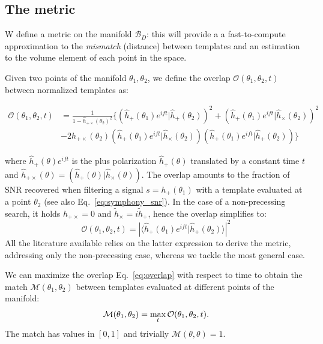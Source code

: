 \documentclass[twocolumn,showpacs,preprintnumbers,nofootinbib,prd,
superscriptaddress,10pt]{revtex4-2}
\newcommand{\scalar}[2]{\langle #1|#2 \rangle}
\newcommand{\rescalar}[2]{( #1 |#2 )}
\newcommand{\rescalarwide}[2]{\left( #1 \lvert #2 \right)}
\begin{document}
\subsection{The metric} \label{sec:metric}

W define a metric on the manifold $\mathcal{B}_D$: this will provide a a fast-to-compute approximation to the {\it mismatch} (distance) between templates and an estimation to the volume element of each point in the space.

Given two points of the manifold $\theta_1,\theta_2$, we define the overlap $\mathcal{O}(\theta_1,\theta_2, t)$ between normalized templates as:
\begin{widetext}
	\begin{align}\label{eq:overlap}
		\mathcal{O}(\theta_1,\theta_2, t) &= \frac{1}{1- \hat{h}_{+\times}(\theta_2)^2} 
		\biggl\{ \rescalarwide{\hat{h}_+(\theta_1)e^{i ft}}{\hat{h}_+(\theta_2)}^2 + \rescalarwide{\hat{h}_+(\theta_1)e^{i ft}}{\hat{h}_\times(\theta_2)}^2 \nonumber \\
		& -2h_{+\times}(\theta_2)\rescalarwide{\hat{h}_+(\theta_1)e^{i ft}}{\hat{h}_\times(\theta_2)}\rescalarwide{\hat{h}_+(\theta_1)e^{i ft}}{\hat{h}_+(\theta_2)} \biggl\}
	\end{align}
\end{widetext}
where $\hat{h}_+(\theta)e^{i ft}$ is the plus polarization $\hat{h}_+(\theta)$ translated by a constant time $t$ and $\hat{h}_{+\times}(\theta) = \rescalar{\hat{h}_+(\theta)}{\hat{h}_\times(\theta)}$.
The overlap amounts to the fraction of SNR recovered when filtering a signal $s=h_+(\theta_1)$ with a template evaluated at a point $\theta_2$ (see also Eq.~\eqref{eq:symphony_snr}).
In the case of a non-precessing search, it holds $h_{+\times} = 0$ and $\tilde{h}_\times = i \tilde{h}_+$, hence the overlap simplifies to:
\begin{equation}\label{eq:overlap_NP}
\mathcal{O}(\theta_1,\theta_2, t) = \left|\scalar{\hat{h}_+(\theta_1)e^{i ft}}{\hat{h}_+(\theta_2)} \right|^2
\end{equation}
All the literature available \cite{owen_metric, Messenger:2008ta, Prix:2007ks, Brown:2012qf, Roy:2017oul, Coogan:2022qxs, Hanna:2022zpk} relies on the latter expression to derive the metric, addressing only the non-precessing case, whereas we tackle the most general case.

We can maximize the overlap Eq.~\eqref{eq:overlap} with respect to time to obtain the match $\mathcal{M}(\theta_1,\theta_2)$ between templates evaluated at different points of the manifold:
\begin{equation}\label{eq:match}
	\mathcal{M}(\theta_1,\theta_2) = \max_t \mathcal{O}(\theta_1,\theta_2, t). \\
\end{equation}
%
The match has values in $[0,1]$ and trivially $\mathcal{M}(\theta,\theta) = 1$.
\end{document}
